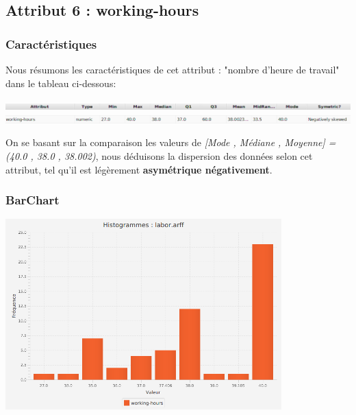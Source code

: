 \documentclass[12pt,a4paper,oneside]{book}
\begin{document}
	
	\newpage
	
	\subsection{Attribut 6 : working-hours }
	\subsubsection{Caractéristiques}
	Nous résumons les caractéristiques de cet attribut : "nombre d'heure de travail" dans le tableau ci-dessous:
	\begin{center}
		\includegraphics[width=1\textwidth]{screens/att.png}\\ \includegraphics[width=1\textwidth]{screens/att-6.png}%
		\label{labelname}%
	\end{center}
	On se basant sur la comparaison les valeurs de \textit{[Mode , Médiane , Moyenne] = (40.0 , 38.0 , 38.002)}, nous déduisons la dispersion des données selon cet attribut, tel qu'il est légèrement \textbf{asymétrique négativement}.
	
	\subsubsection{BarChart}
	\begin{center}
		\includegraphics[width=0.8\textwidth]{screens/barchart/working-hours-barchart.png}%
		\label{labelname}%
	\end{center}
\end{document}
